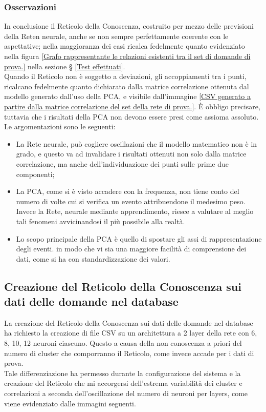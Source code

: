\subsubsection{Osservazioni}
\label{Osservazioni Reticolo dati di prova}
In conclusione il Reticolo della Conoscenza, costruito per mezzo delle previsioni della Reten neurale, anche se non sempre perfettamente coerente con le aspettative; nella maggioranza dei casi ricalca fedelmente quanto evidenziato nella figura \ref{Grafo rappresentante le relazioni esistenti tra il set di domande di prova.} nella sezione § \ref{Test effettuati}. \\
Quando il Reticolo non \`e soggetto a deviazioni, gli accoppiamenti tra i punti, ricalcano fedelmente quanto dichiarato dalla matrice correlazione ottenuta dal modello generato dall'uso della PCA, e visibile dall'immagine \ref{CSV generato a partire dalla matrice correlazione del set della rete di prova.}.
\`E obbligo precisare, tuttavia che i risultati della PCA non devono essere presi come assioma assoluto. Le argomentazioni sono le seguenti:
\begin{itemize} 
\item La Rete neurale, pu\`o cogliere oscillazioni che il modello matematico non \`e in grado, e questo va ad invalidare i risultati ottenuti non solo dalla matrice correlazione, ma anche dell'individuazione dei punti sulle prime due componenti;
\item La PCA, come si \`e visto accadere con la frequenza, non tiene conto del numero di volte cui si verifica un evento attribuendone il medesimo peso. Invece la Rete, neurale mediante apprendimento, riesce a valutare al meglio tali fenomeni avvicinandosi il pi\`u possibile alla realt\`a.
\item Lo scopo principale della PCA \`e quello di spostare gli assi di rappresentazione degli eventi. in modo che vi sia una maggiore facilit\`a di comprensione dei dati, come si ha con standardizzazione dei valori.
\end{itemize}

\subsection{Creazione del Reticolo della Conoscenza sui dati delle domande nel database}
\label{Creazione del Reticolo della Conoscenza sui dati delle domande nel database}

La creazione del Reticolo della Conoscenza sui dati delle domande nel database ha richiesto la creazione di file CSV su un architettura a 2 layer della rete con 6, 8, 10, 12 neuroni ciascuno. Questo a causa della non conoscenza a priori del numero di cluster che comporranno il Reticolo, come invece accade per i dati di prova.\\
Tale differenziazione ha permesso durante la configurazione del sistema e la creazione del Reticolo che mi accorgersi dell'estrema variabilit\`a dei cluster e correlazioni a seconda dell'oscillazione del numero di neuroni per layers, come viene evidenziato dalle immagini seguenti.


